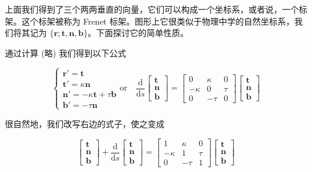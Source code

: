 \documentclass[a4paper, 12pt]{article}
\begin{document}
    上面我们得到了三个两两垂直的向量，它们可以构成一个坐标系，或者说，一个标架。这个标架被称为 Frenet 标架。图形上它很类似于物理中学的自然坐标系，我们将其记为 $\{\boldsymbol r; \boldsymbol t, \boldsymbol n, \boldsymbol b\}$。下面探讨它的简单性质。

    通过计算 (略) 我们得到以下公式

    \begin{equation}
    \begin{cases}
    \boldsymbol r' = \boldsymbol t\\
    \boldsymbol t' = \kappa \boldsymbol n\\
    \boldsymbol n' = -\kappa \boldsymbol t + \tau \boldsymbol b \\
    \boldsymbol b' = -\tau \boldsymbol n 
    \end{cases}
    \text{or}\quad
    \frac{\mathrm d}{\mathrm ds}
    \begin{bmatrix}
    \boldsymbol t\\
    \boldsymbol n\\
    \boldsymbol b
    \end{bmatrix}
    =\begin{bmatrix}
    0 & \kappa & 0\\
    -\kappa & 0 & \tau\\
    0 & -\tau & 0
    \end{bmatrix}
    \begin{bmatrix}
    \boldsymbol t\\
    \boldsymbol n\\
    \boldsymbol b
    \end{bmatrix}
    \end{equation}

    很自然地，我们改写右边的式子，使之变成

    \[
    \begin{bmatrix}
    \boldsymbol t\\
    \boldsymbol n\\
    \boldsymbol b
    \end{bmatrix}+
    \frac{\mathrm d}{\mathrm ds}
    \begin{bmatrix}
    \boldsymbol t\\
    \boldsymbol n\\
    \boldsymbol b
    \end{bmatrix}
    =\begin{bmatrix}
    1 & \kappa & 0\\
    -\kappa & 1 & \tau\\
    0 & -\tau & 1
    \end{bmatrix}
    \begin{bmatrix}
    \boldsymbol t\\
    \boldsymbol n\\
    \boldsymbol b
    \end{bmatrix}
    \]
	
\end{document}
